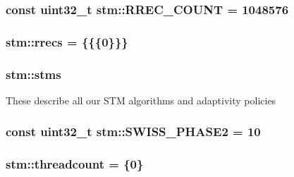 \hypertarget{namespacestm_ac811b3e7503fcf79d860e5a9f997f673}{
\subsubsection[{R\-R\-E\-C\-\_\-\-C\-O\-U\-N\-T}]{\setlength{\rightskip}{0pt plus 5cm}const uint32\-\_\-t stm\-::\-R\-R\-E\-C\-\_\-\-C\-O\-U\-N\-T = 1048576\hspace{0.3cm}{\ttfamily [static]}}}\label{namespacestm_ac811b3e7503fcf79d860e5a9f997f673}
\hypertarget{namespacestm_a025af84316e5fb6b9033dec86640f912}{
\subsubsection[{rrecs}]{ stm\-::rrecs = \{\{\{0\}\}\}}}\label{namespacestm_a025af84316e5fb6b9033dec86640f912}
\hypertarget{namespacestm_af0a1336341054a7273c3d732d248f7fc}{
\subsubsection[{stms}]{ stm\-::stms}}\label{namespacestm_af0a1336341054a7273c3d732d248f7fc}
These describe all our S\-T\-M algorithms and adaptivity policies \hypertarget{namespacestm_a08d03c541bfa9d260904138ed0ccda6b}{
\subsubsection[{S\-W\-I\-S\-S\-\_\-\-P\-H\-A\-S\-E2}]{\setlength{\rightskip}{0pt plus 5cm}const uint32\-\_\-t stm\-::\-S\-W\-I\-S\-S\-\_\-\-P\-H\-A\-S\-E2 = 10\hspace{0.3cm}{\ttfamily [static]}}}\label{namespacestm_a08d03c541bfa9d260904138ed0ccda6b}
\hypertarget{namespacestm_ac554ffc5ca7bee783d48142f1a0ff82b}{
\subsubsection[{threadcount}]{ stm\-::threadcount = \{0\}}}\label{namespacestm_ac554ffc5ca7bee783d48142f1a0ff82b}
